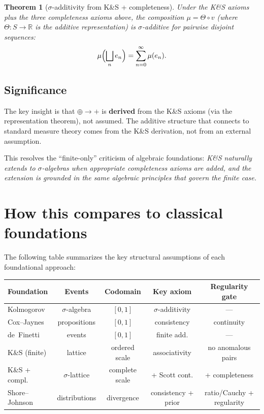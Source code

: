 \documentclass[11pt]{article}
\newtheorem{theorem}{Theorem}[section]
\theoremstyle{definition}
\theoremstyle{remark}
\begin{document}
\begin{theorem}[$\sigma$-additivity from K\&S + completeness]
Under the K\&S axioms plus the three completeness axioms above, the composition
$\mu = \Theta \circ v$ (where $\Theta : S \to \mathbb{R}$ is the additive representation)
is $\sigma$-additive for pairwise disjoint sequences:
\[
\mu\Bigl(\bigsqcup_n e_n\Bigr) = \sum_{n=0}^\infty \mu(e_n).
\]
\end{theorem}


\subsection{Significance}

The key insight is that $\oplus \to +$ is \textbf{derived} from the K\&S axioms (via the representation
theorem), not assumed.  The additive structure that connects to standard measure theory comes from
the K\&S derivation, not from an external assumption.

This resolves the ``finite-only'' criticism of algebraic foundations: \emph{K\&S naturally extends to
$\sigma$-algebras when appropriate completeness axioms are added, and the extension is grounded
in the same algebraic principles that govern the finite case.}

\section{How this compares to classical foundations}

The following table summarizes the key structural assumptions of each foundational approach:

\begin{center}
\small
\begin{tabular}{|l|c|c|c|c|}
\hline
\textbf{Foundation} & \textbf{Events} & \textbf{Codomain} & \textbf{Key axiom} & \textbf{Regularity gate} \\
\hline
Kolmogorov & $\sigma$-algebra & $[0,1]$ & $\sigma$-additivity & --- \\
\hline
Cox--Jaynes & propositions & $[0,1]$ & consistency & continuity \\
\hline
de~Finetti & events & $[0,1]$ & finite add. & --- \\
\hline
K\&S (finite) & lattice & ordered scale & associativity & no anomalous pairs \\
\hline
K\&S + compl. & $\sigma$-lattice & complete scale & + Scott cont. & + completeness \\
\hline
Shore--Johnson & distributions & divergence & consistency + prior & ratio/Cauchy + regularity \\
\hline
\end{tabular}
\end{center}
\end{document}
